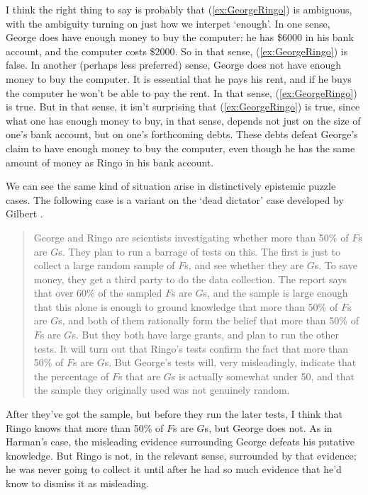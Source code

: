 I think the right thing to say is probably that (\ref{ex:GeorgeRingo}) is ambiguous, with the ambiguity turning on just how we interpet `enough'. In one sense, George does have enough money to buy the computer: he has \$6000 in his bank account, and the computer costs \$2000. So in that sense, (\ref{ex:GeorgeRingo}) is false. In another (perhaps less preferred) sense, George does not have enough money to buy the computer. It is essential that he pays his rent, and if he buys the computer he won't be able to pay the rent. In that sense, (\ref{ex:GeorgeRingo}) is true. But in that sense, it isn't surprising that (\ref{ex:GeorgeRingo}) is true, since what one has enough money to buy, in that sense, depends not just on the size of one's bank account, but on one's forthcoming debts. These debts defeat George's claim to have enough money to buy the computer, even though he has the same amount of money as Ringo in his bank account.

We can see the same kind of situation arise in distinctively epistemic puzzle cases. The following case is a variant on the `dead dictator' case developed by Gilbert \cite{Harman1973}.

\begin{quote}
George and Ringo are scientists investigating whether more than 50\% of \(F\)s are \(G\)s. They plan to run a barrage of tests on this. The first is just to collect a large random sample of \(F\)s, and see whether they are \(G\)s. To save money, they get a third party to do the data collection. The report says that over 60\% of the sampled \(F\)s are \(G\)s, and the sample is large enough that this alone is enough to ground knowledge that more than 50\% of \(F\)s are \(G\)s, and both of them rationally form the belief that more than 50\% of \(F\)s are \(G\)s. But they both have large grants, and plan to run the other tests. It will turn out that Ringo's tests confirm the fact that more than 50\% of \(F\)s are \(G\)s. But George's tests will, very misleadingly, indicate that the percentage of \(F\)s that are \(G\)s is actually somewhat under 50, and that the sample they originally used was not genuinely random.
\end{quote}

\noindent After they've got the sample, but before they run the later tests, I think that Ringo knows that more than 50\% of \(F\)s are \(G\)s, but George does not. As in Harman's case, the misleading evidence surrounding George defeats his putative knowledge. But Ringo is not, in the relevant sense, surrounded by that evidence; he was never going to collect it until after he had so much evidence that he'd know to dismiss it as misleading.

